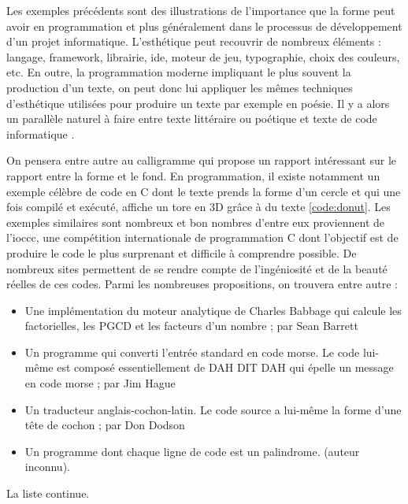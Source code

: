 \documentclass[12pt]{article} %
\begin{document}
Les exemples précédents sont des illustrations de l'importance que la forme peut avoir en programmation et plus généralement dans le processus de développement d'un projet informatique. L'esthétique peut recouvrir de nombreux éléments : langage, framework, librairie, \acrshort{ide}, moteur de jeu, typographie, choix des couleurs, etc. En outre, la programmation moderne impliquant le plus souvent la production d'un texte, on peut donc lui appliquer les mêmes techniques d'esthétique utilisées pour produire un texte par exemple en poésie. Il y a alors un parallèle naturel à faire entre texte littéraire ou poétique et texte de code informatique \cite{FCramer2001}.

On pensera entre autre au \gls{calligramme} qui propose un rapport intéressant sur le rapport entre la forme et le fond. En programmation, il existe notamment un exemple célèbre de code en C dont le texte prends la forme d'un cercle et qui une fois compilé et exécuté, affiche un tore en 3D grâce à du texte \autoref{code:donut}. Les exemples similaires sont nombreux et bon nombres d'entre eux proviennent de l'\acrshort{ioccc}, une compétition internationale de programmation C dont l'objectif est de produire le code le plus surprenant et difficile à comprendre possible. De nombreux sites permettent de se rendre compte de l'ingéniosité et de la beauté réelles de ces codes. Parmi les nombreuses propositions, on trouvera entre autre :
\begin{itemize}\label{exemples-ioccc}
    \item Une implémentation du moteur analytique de Charles Babbage qui calcule les factorielles, les PGCD et les facteurs d'un nombre ; par Sean Barrett \cite{SBarrett-Babble}
    \item Un programme qui converti l'entrée standard en code morse. Le code lui-même est composé essentiellement de DAH DIT DAH qui épelle un message en code morse ; par Jim Hague \cite{JHague-morse}
    \item Un traducteur anglais-cochon-latin. Le code source a lui-même la forme d'une tête de cochon ; par Don Dodson \cite{DDodson-piglatin}
    \item Un programme dont chaque ligne de code est un \gls{palindrome}. (auteur inconnu). 
\end{itemize}
La liste continue. 
\end{document}
